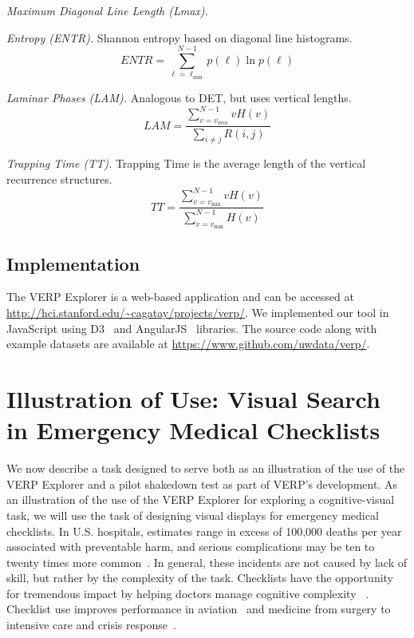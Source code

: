 \documentclass[journal]{vgtc}                %
\begin{document}
\emph{Maximum Diagonal Line Length  (Lmax).}


\emph{Entropy (ENTR).}  Shannon entropy based on diagonal line histograms.
\[
	ENTR = 
    \sum_{\ell = \ell_{\min}}^{N-1}{p(\ell)\ln p(\ell) }
\]
 
\emph{Laminar Phases (LAM).} Analogous to DET, but uses vertical lengths.
\[
	LAM =
	\frac{
		\sum_{v = v_{min} }^{N - 1} { vH(v) }
	}{
		\sum_{i\neq j}{ R(i,j)}
	}
\]
 
\emph{Trapping Time (TT).} Trapping Time is the average length of the
vertical recurrence structures.
\[
	TT = 
	\frac{
		\sum_{v=v_{\min} }^{N-1}{vH(v)}
 	}{
		\sum_{v=v_{\min} }^{N-1}{ H(v)}
 	}
\]

\subsection{Implementation}  The VERP Explorer is a web-based application
and can be accessed at \url{http://hci.stanford.edu/~cagatay/projects/verp/}. 
We implemented our tool in JavaScript using D3~\cite{d3_infovis11} and AngularJS~\cite{angularweb} 
libraries.  The source code along with example datasets are available at 
\url{https://www.github.com/uwdata/verp/}. 


\section{Illustration of Use: Visual Search in Emergency Medical Checklists}

We now describe a task designed  to serve both as an illustration of the use 
of the VERP Explorer and a pilot shakedown test as part of VERP's development. 
As an illustration of the use of the VERP Explorer for exploring a
cognitive-visual task, we will use the task of designing visual displays
for emergency medical checklists. In U.S. hospitals, estimates range in
excess of 100,000 deaths per year associated with preventable harm, and
serious complications may be ten to twenty times more common~\cite{James_2013}. 
In general, these incidents are not caused by lack of skill, but rather by the
complexity of the task.  Checklists have the opportunity for tremendous
impact by helping doctors manage cognitive complexity ~\cite{Gawande_2009}. 
Checklist use improves performance in aviation~\cite{Boorman_2001,Degani_1990,Burian_2005} 
and medicine from  surgery to intensive care and crisis response~\cite{Arriaga_2013,Gawande_2009,Harrison_2006, 
Haynes_2009,Makary_2006,Pronovost_2006,Ziewacz_2011}.
\end{document}

